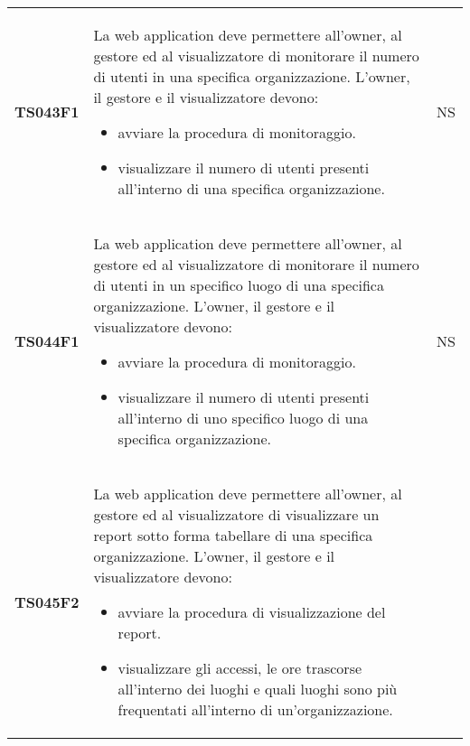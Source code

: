 \documentclass[../piano-di-qualifica.tex]{subfiles}
\begin{document}
\begin{centering}
\begin{longtable}[H]{>{\centering\bfseries}m{3cm} >{}p{10cm} >{\centering\arraybackslash}m{3cm}}
    TS043F1            & La web application deve permettere all'owner, al gestore ed al visualizzatore di monitorare il numero di utenti in una specifica organizzazione. \newline
    L'owner, il gestore e il visualizzatore devono:
    \begin{itemize}
      \item avviare la procedura di monitoraggio.
      \item visualizzare il numero di utenti presenti all'interno di una specifica organizzazione.
    \end{itemize}
                       & NS                                                                                                                                                                                                                                                               \\
    TS044F1            & La web application deve permettere all'owner, al gestore ed al visualizzatore di monitorare il numero di utenti in un specifico luogo di una specifica organizzazione. \newline
    L'owner, il gestore e il visualizzatore devono:
    \begin{itemize}
      \item avviare la procedura di monitoraggio.
      \item visualizzare il numero di utenti presenti all'interno di uno specifico luogo di una specifica organizzazione.
    \end{itemize}
                       & NS                                                                                                                                                                                                                                                               \\
    TS045F2            & La web application deve permettere all'owner, al gestore ed al visualizzatore di visualizzare un report sotto forma tabellare di una specifica organizzazione. \newline
    L'owner, il gestore e il visualizzatore devono:
    \begin{itemize}
      \item avviare la procedura di visualizzazione del report.
      \item visualizzare gli accessi, le ore trascorse all'interno dei luoghi e quali luoghi sono più frequentati all'interno di un'organizzazione.
    \end{itemize}

\end{longtable}
\end{centering}
\end{document}
